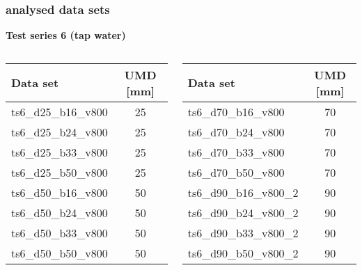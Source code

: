 	\begin{frame}
		\frametitle{\appendixname{} \textendash{} analysed data sets}
		\textbf{Test series 6 (tap water)}\autocite{ts6data}\\
		\vspace*{1em}
		\begin{columns}[t]
			\begin{column}{.5\textwidth}
				\begin{tabular}{l c}
					\toprule
					Data set            & UMD [mm] \\ \midrule
					ts6\_d25\_b16\_v800 & 25       \\
					ts6\_d25\_b24\_v800 & 25       \\
					ts6\_d25\_b33\_v800 & 25       \\
					ts6\_d25\_b50\_v800 & 25       \\
					ts6\_d50\_b16\_v800 & 50       \\
					ts6\_d50\_b24\_v800 & 50       \\
					ts6\_d50\_b33\_v800 & 50       \\
					ts6\_d50\_b50\_v800 & 50       \\ \bottomrule
				\end{tabular}
			\end{column}
			\begin{column}{.5\textwidth}
				\begin{tabular}{l c}
					\toprule
					Data set               & UMD [mm] \\ \midrule
					ts6\_d70\_b16\_v800    & 70       \\
					ts6\_d70\_b24\_v800    & 70       \\
					ts6\_d70\_b33\_v800    & 70       \\
					ts6\_d70\_b50\_v800    & 70       \\
					ts6\_d90\_b16\_v800\_2 & 90       \\
					ts6\_d90\_b24\_v800\_2 & 90       \\
					ts6\_d90\_b33\_v800\_2 & 90       \\
					ts6\_d90\_b50\_v800\_2 & 90       \\ \bottomrule
				\end{tabular}
			\end{column}
		\end{columns}
	\end{frame}

